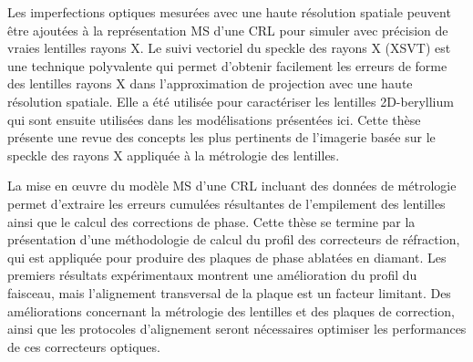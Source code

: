 Les imperfections optiques mesurées avec une haute résolution spatiale peuvent être ajoutées à la représentation MS d'une CRL pour simuler avec précision de vraies lentilles rayons X. Le suivi vectoriel du speckle des rayons X (XSVT) est une technique polyvalente qui permet d'obtenir facilement les erreurs de forme des lentilles rayons X dans l'approximation de projection avec une haute résolution spatiale. Elle a été utilisée pour caractériser les lentilles 2D-beryllium qui sont ensuite utilisées dans les modélisations présentées ici. Cette thèse présente une revue des concepts les plus pertinents de l'imagerie basée sur le speckle des rayons X appliquée à la métrologie des lentilles.

La mise en œuvre du modèle MS d’une CRL incluant des données de métrologie permet d’extraire les erreurs cumulées résultantes de l’empilement des lentilles ainsi que le calcul des corrections de phase. Cette thèse se termine par la présentation d'une méthodologie de calcul du profil des correcteurs de réfraction, qui est appliquée pour produire des plaques de phase ablatées en diamant. Les premiers résultats expérimentaux montrent une amélioration du profil du faisceau, mais l'alignement transversal de la plaque est un facteur limitant. Des améliorations concernant la métrologie des lentilles et des plaques de correction, ainsi que les protocoles d'alignement seront nécessaires optimiser les performances de ces correcteurs optiques.

